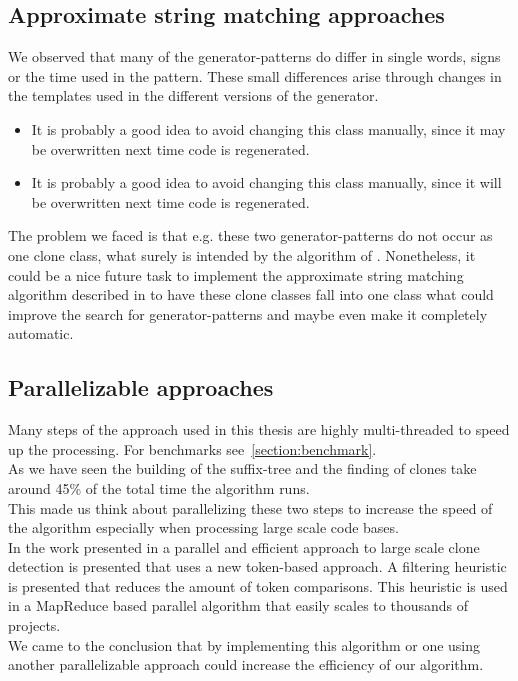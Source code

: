 \subsection{Approximate string matching approaches}
We observed that many of the generator-patterns do differ in single words, signs or the time used in the pattern. These small differences arise through changes in the templates used in the different versions of the generator. 
\begin{itemize}
	\item It is probably a good idea to avoid changing this class manually, since it \textcolor{TUMAccentOrange}{may} be overwritten next time code is regenerated.
	\item It is probably a good idea to avoid changing this class manually, since it \textcolor{TUMAccentOrange}{will} be overwritten next time code is regenerated.
\end{itemize}
The problem we faced is that e.g. these two generator-patterns do not occur as one clone class, what surely is intended by the algorithm of \cite{Ukkonen1995}. Nonetheless, it could be a nice future task to implement the approximate string matching algorithm described in \cite{Ukkonen1993} to have these clone classes fall into one class what could improve the search for generator-patterns and maybe even make it completely automatic.

\subsection{Parallelizable approaches}
Many steps of the approach used in this thesis are highly multi-threaded to speed up the processing. For benchmarks see~\ref{section:benchmark}.\\
As we have seen the building of the suffix-tree and the finding of clones take around 45\% of the total time the algorithm runs. \\
This made us think about parallelizing these two steps to increase the speed of the algorithm especially when processing large scale code bases.\\
In the work presented in \cite{Sajnani2013} a parallel and efficient approach to large scale clone detection is presented that uses a new token-based approach. A filtering heuristic is presented that reduces the amount of token comparisons. This heuristic is used in a MapReduce based parallel algorithm that easily scales to thousands of projects.\\
We came to the conclusion that by implementing this algorithm or one using another parallelizable approach could increase the efficiency of our algorithm. 


